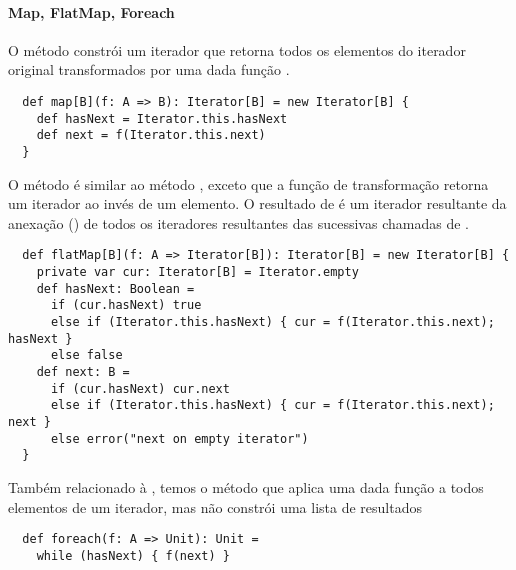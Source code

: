 {\paragraph{Map, FlatMap, Foreach} O método  
constrói um iterador que retorna todos os elementos do iterador original transformados por uma dada função .
\begin{lstlisting}
  def map[B](f: A => B): Iterator[B] = new Iterator[B] {
    def hasNext = Iterator.this.hasNext
    def next = f(Iterator.this.next)
  }
\end{lstlisting}
O método  é similar ao método , exceto que a função de transformação  retorna um iterador 
ao invés de um elemento. O resultado de  é um iterador resultante da anexação () de todos os iteradores resultantes
das sucessivas chamadas de .
\begin{lstlisting}
  def flatMap[B](f: A => Iterator[B]): Iterator[B] = new Iterator[B] {
    private var cur: Iterator[B] = Iterator.empty
    def hasNext: Boolean =
      if (cur.hasNext) true
      else if (Iterator.this.hasNext) { cur = f(Iterator.this.next); hasNext }
      else false
    def next: B =
      if (cur.hasNext) cur.next
      else if (Iterator.this.hasNext) { cur = f(Iterator.this.next); next }
      else error("next on empty iterator")
  }
\end{lstlisting}
Também relacionado à , temos o método  que aplica uma
dada função a todos elementos de um iterador, mas não constrói uma lista de resultados
\begin{lstlisting}
  def foreach(f: A => Unit): Unit =
    while (hasNext) { f(next) }
\end{lstlisting}

}
